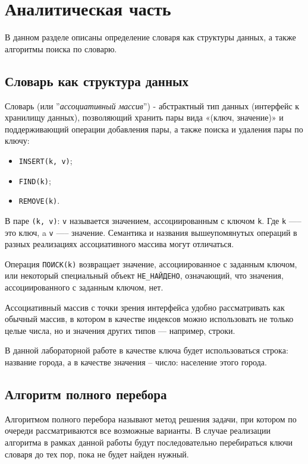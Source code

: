 \chapter{Аналитическая часть}
В данном разделе описаны определение словаря как структуры данных, а также алгоритмы поиска по словарю.

\section{Словарь как структура данных}

Словарь (или ''\textit{ассоциативный массив}'') \cite{dict} - абстрактный тип данных (интерфейс к хранилищу данных), позволяющий хранить пары вида «(ключ, значение)» и поддерживающий операции добавления пары, а также поиска и удаления пары по ключу:
\begin{itemize}
	\item \texttt{INSERT(k, v)};
	\item \texttt{FIND(k)};
	\item \texttt{REMOVE(k)}.
\end{itemize}

В паре \texttt{(k, v)}: \texttt{v} называется значением, ассоциированным с ключом \texttt{k}. Где \texttt{k} —-- это ключ, a \texttt{v} —-- значение. Семантика и названия вышеупомянутых операций в разных реализациях ассоциативного массива могут отличаться.

Операция \texttt{ПОИСК(k)} возвращает значение, ассоциированное с заданным ключом, или некоторый специальный объект \texttt{НЕ\_НАЙДЕНО}, означающий, что значения, ассоциированного с заданным ключом, нет.

Ассоциативный массив с точки зрения интерфейса удобно рассматривать как обычный массив, в котором в качестве индексов можно использовать не только целые числа, но и значения других типов — например, строки.

В данной лабораторной работе в качестве ключа будет использоваться строка: название города, а в качестве значения -- число: население этого города.

\section{Алгоритм полного перебора}
Алгоритмом полного перебора \cite{AI} называют метод решения задачи, при котором по очереди рассматриваются все возможные варианты. В случае реализации алгоритма в рамках данной работы будут последовательно перебираться ключи словаря до тех пор, пока не будет найден нужный. 

